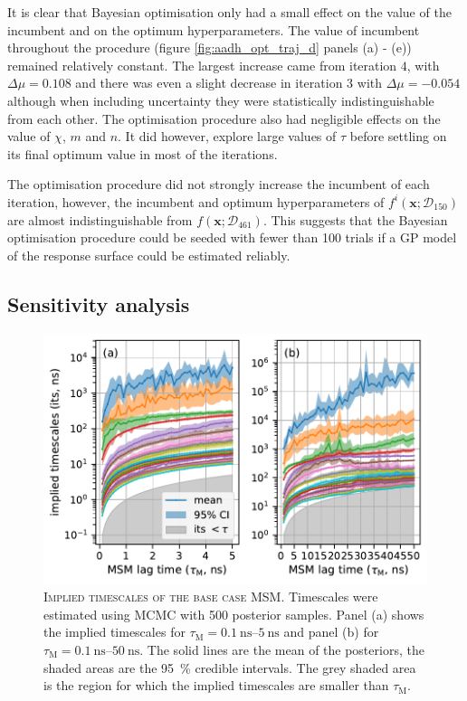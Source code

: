 It is clear that Bayesian optimisation only had a small effect on the value of the incumbent and on the optimum hyperparameters.  The value of incumbent throughout the procedure (figure \ref{fig:aadh_opt_traj_d} panels (a) - (e)) remained relatively constant. The largest increase came from iteration $4$, with $\Delta \mu = 0.108$ and there was even a slight decrease in iteration $3$ with $\Delta \mu = -0.054$ although when including  uncertainty they were statistically indistinguishable from each other. The optimisation procedure also had negligible effects on the value of $\chi$, $m$ and $n$. It did however, explore large values of  $\tau$ before settling on its final optimum value in most of the iterations.

The optimisation procedure did not strongly increase the incumbent of each iteration, however, the incumbent and optimum hyperparameters of  $f^{i}\left(\mathbf{x};\mathcal{D}_{150}\right)$ are almost indistinguishable from $f\left(\mathbf{x};\mathcal{D}_{461}\right)$. This suggests that the Bayesian optimisation procedure could be seeded with fewer than \num{100} trials if a GP model of the response surface could be estimated reliably. 

\subsection{Sensitivity analysis}\label{sec:aadh_sens_analysis}

\begin{figure}
    \centering
    \includegraphics[width=0.8\linewidth]{chapters/msm_optimization/figures/aadh_implied_timescales.pdf}
    \caption[Implied timescales of the base case MSM]{\textsc{Implied timescales of the base case MSM}. Timescales were estimated using MCMC with \num{500} posterior samples. Panel (a) shows the implied timescales for $\tau_{\mathrm{M}} = \SIrange[range-phrase=\text{--}]{0.1}{5}{\nano\second}$  and panel (b) for $\tau_{\mathrm{M}} = \SIrange[range-phrase=\text{--}]{0.1}{50}{\nano\second}$. The solid lines are the mean of the posteriors, the shaded areas are the  \SI{95}{\percent} credible intervals. The grey shaded area is the region for which the implied timescales are smaller than $\tau_{\mathrm{M}}$.}\label{fig:aadh_its}
\end{figure}

